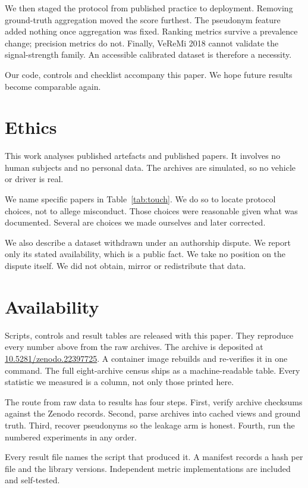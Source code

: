 \documentclass[conference]{IEEEtran}
\begin{document}
We then staged the protocol from published practice to deployment.
Removing ground-truth aggregation moved the score furthest.
The pseudonym feature added nothing once aggregation was fixed.
Ranking metrics survive a prevalence change; precision metrics do not.
Finally, VeReMi 2018 cannot validate the signal-strength family.
An accessible calibrated dataset is therefore a necessity.

Our code, controls and checklist accompany this paper.
We hope future results become comparable again.

\section*{Ethics}

This work analyses published artefacts and published papers.
It involves no human subjects and no personal data.
The archives are simulated, so no vehicle or driver is real.

We name specific papers in Table~\ref{tab:touch}.
We do so to locate protocol choices, not to allege misconduct.
Those choices were reasonable given what was documented.
Several are choices we made ourselves and later corrected.

We also describe a dataset withdrawn under an authorship dispute.
We report only its stated availability, which is a public fact.
We take no position on the dispute itself.
We did not obtain, mirror or redistribute that data.

\section*{Availability}

Scripts, controls and result tables are released with this paper.
They reproduce every number above from the raw archives.
The archive is deposited at \url{10.5281/zenodo.22397725}.
A container image rebuilds and re-verifies it in one command.
The full eight-archive census ships as a machine-readable table.
Every statistic we measured is a column, not only those printed here.

The route from raw data to results has four steps.
First, verify archive checksums against the Zenodo records.
Second, parse archives into cached views and ground truth.
Third, recover pseudonyms so the leakage arm is honest.
Fourth, run the numbered experiments in any order.

Every result file names the script that produced it.
A manifest records a hash per file and the library versions.
Independent metric implementations are included and self-tested.
\end{document}
